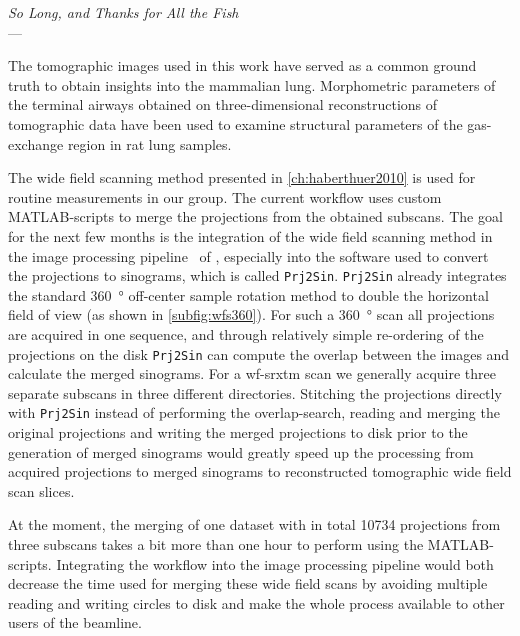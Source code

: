 \acresetall
{}\label{ch:outlook}
\begin{flushright}{\slshape    
		So Long, and Thanks for All the Fish} \\ \medskip
    ---  \citep{Adams1984}
\end{flushright}

\vfill

The tomographic images used in this work have served as a common ground truth to obtain insights into the mammalian lung. Morphometric parameters of the terminal airways obtained on three-dimensional reconstructions of tomographic data have been used to examine structural parameters of the gas-exchange region in rat lung samples.

The wide field scanning method presented in \autoref{ch:haberthuer2010} is used for routine measurements in our group. The current workflow uses custom MATLAB-scripts to merge the projections from the obtained subscans. The goal for the next few months is the integration of the wide field scanning method in the image processing pipeline~\cite{Hintermueller2010} of , especially into the software used to convert the projections to sinograms, which is called \texttt{Prj2Sin}. \texttt{Prj2Sin} already integrates the standard \SI{360}{\degree} off-center sample rotation method to double the horizontal field of view (as shown in \autoref{subfig:wfs360}). For such a \SI{360}{\degree} scan all projections are acquired in one sequence, and through relatively simple re-ordering of the projections on the disk \texttt{Prj2Sin} can compute the overlap between the images and calculate the merged sinograms. For a \ac{wf-srxtm} scan we generally acquire three separate subscans in three different directories. Stitching the projections directly with \texttt{Prj2Sin} instead of performing the overlap-search, reading and merging the original projections and writing the merged projections to disk prior to the generation of merged sinograms would greatly speed up the processing from acquired projections to merged sinograms to reconstructed tomographic wide field scan slices.

At the moment, the merging of one dataset with in total \num{10734} projections from three subscans takes a bit more than one hour to perform using the MATLAB-scripts. Integrating the workflow into the image processing pipeline would both decrease the time used for merging these wide field scans by avoiding multiple reading and writing circles to disk and make the whole process available to other users of the beamline.

